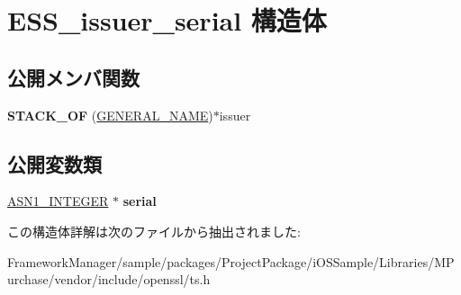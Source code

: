 \hypertarget{struct_e_s_s__issuer__serial}{}\section{E\+S\+S\+\_\+issuer\+\_\+serial 構造体}
\label{struct_e_s_s__issuer__serial}
\subsection*{公開メンバ関数}
\begin{DoxyCompactItemize}
\item 
\hypertarget{struct_e_s_s__issuer__serial_a760dde58f124b2aff371ebf2e6dc70a9}{}{\bfseries S\+T\+A\+C\+K\+\_\+\+O\+F} (\hyperlink{struct_g_e_n_e_r_a_l___n_a_m_e__st}{G\+E\+N\+E\+R\+A\+L\+\_\+\+N\+A\+M\+E})$\ast$issuer\label{struct_e_s_s__issuer__serial_a760dde58f124b2aff371ebf2e6dc70a9}

\end{DoxyCompactItemize}
\subsection*{公開変数類}
\begin{DoxyCompactItemize}
\item 
\hypertarget{struct_e_s_s__issuer__serial_a7843f6a7d665ee063b624b3d57d16719}{}\hyperlink{structasn1__string__st}{A\+S\+N1\+\_\+\+I\+N\+T\+E\+G\+E\+R} $\ast$ {\bfseries serial}\label{struct_e_s_s__issuer__serial_a7843f6a7d665ee063b624b3d57d16719}

\end{DoxyCompactItemize}


この構造体詳解は次のファイルから抽出されました\+:\begin{DoxyCompactItemize}
\item 
Framework\+Manager/sample/packages/\+Project\+Package/i\+O\+S\+Sample/\+Libraries/\+M\+Purchase/vendor/include/openssl/ts.\+h\end{DoxyCompactItemize}
